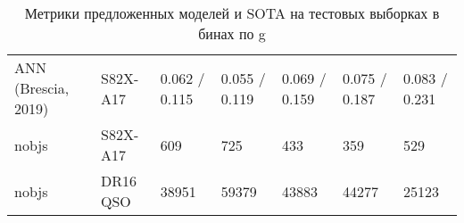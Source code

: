 \begin{table*}
\begin{tabular}{lllllll}
          ANN (Brescia, 2019) &  S82X-A17 &                    0.062 / 0.115 &                    0.055 / 0.119 &                    0.069 / 0.159 &                    0.075 / 0.187 &                    0.083 / 0.231 \\
                        nobjs &  S82X-A17 &                              609 &                              725 &                              433 &                              359 &                              529 \\
                        nobjs &  DR16 QSO &                            38951 &                            59379 &                            43883 &                            44277 &                            25123 \\
    \hline
    \end{tabular}
    
    \caption{Метрики предложенных моделей и SOTA на тестовых выборках в бинах по g}
    \label{tab:metrics-rmag}
\end{table*}


